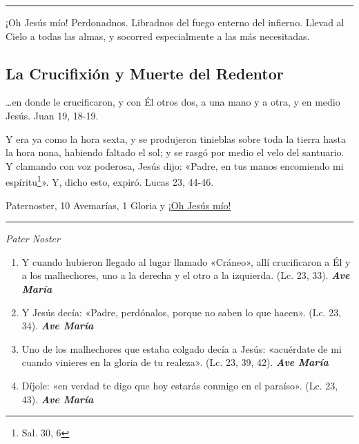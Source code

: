 \documentclass[a4paper,11pt, oneside]{report}
\begin{document}
{{      \begin{center}\rule{1\linewidth}{\linethickness}\end{center}      
      
      \medskip
      \hypertarget{finalCruz}{¡Oh Jesús mío! Perdonadnos. Libradnos del fuego enterno del infierno. Llevad al Cielo a todas las almas, y socorred especialmente a las más 
      necesitadas.}
    }
  
  \subsection*{La Crucifixión y Muerte del Redentor}
    {
      {\ldots}en donde le crucificaron, y con Él otros dos, a una mano y a otra, y en medio Jesús. Juan 19, 18-19.

      \smallskip
      Y era ya como la hora sexta, y se produjeron tinieblas sobre toda la tierra hasta la hora nona, habiendo faltado el sol; y se rasgó por medio 
      el velo del santuario. Y clamando con voz poderosa, Jesús dijo: «Padre, en tus manos encomiendo mi espíritu\footnote{Sal. 30, 6}». 
      Y, dicho esto, expiró. Lucas 23, 44-46.
      
       Paternoster, 10 Avemarías, 1 Gloria y \hyperlink{finalMuerte}{¡Oh Jesús mío!}

      \begin{center}\rule{1\linewidth}{\linethickness}\end{center}

      \medskip
      \textit{Pater Noster}

      \begin{enumerate}
        
        \item Y cuando hubieron llegado al lugar llamado «Cráneo», allí crucificaron a Él y a los malhechores, uno a la derecha y el otro a la izquierda. 
        (Lc. 23, 33). \textbf{\textit{Ave María}}

        \item Y Jesús decía: «Padre, perdónalos, porque no saben lo que hacen». (Lc. 23, 34). \textbf{\textit{Ave María}}

        \item Uno de los malhechores que estaba colgado decía a Jesús: «acuérdate de mi cuando vinieres en la gloria de tu realeza». 
        (Lc. 23, 39, 42). \textbf{\textit{Ave María}}

        \item Díjole: «en verdad te digo que hoy estarás conmigo en el paraíso». (Lc. 23, 43). \textbf{\textit{Ave María}}


\end{enumerate}}}
\end{document}
